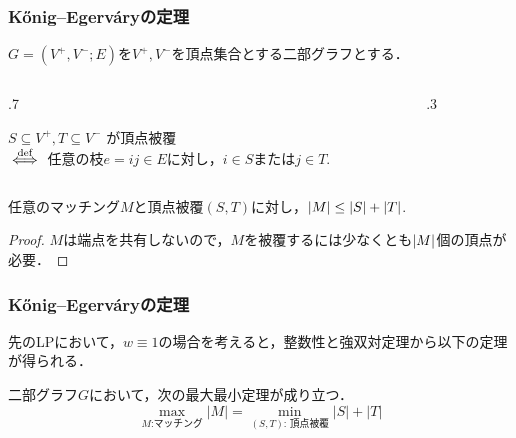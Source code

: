 \documentclass[14pt,aspectratio=169,xcolor=dvipsnames,table,onlytextwidth,dvipdfmx]{beamer}
\begin{document}
\begin{frame}
    \frametitle{K\H{o}nig--Egerv\'aryの定理}

    $G = (V^+, V^-; E)$を$V^+, V^-$を頂点集合とする二部グラフとする．

    \begin{columns}
    \begin{column}{.7\textwidth}
    \begin{definition}
        $S \subseteq V^+, T \subseteq V^-$ が\alert{頂点被覆} \\
        $\overset{\text{def}}{\iff}$ 任意の枝$e = ij \in E$に対し，$i \in S$または$j \in T$.
    \end{definition}
    \end{column}
    \begin{column}{.3\textwidth}
        \centering
        \footnotesize
    \end{column}
    \end{columns}
    \begin{lemma}[弱双対性]
        任意のマッチング$M$と頂点被覆$(S,T)$に対し，$\lvert M\rvert \leq \lvert S\rvert + \lvert T\rvert$.
    \end{lemma}
    \begin{proof}
        $M$は端点を共有しないので，$M$を被覆するには少なくとも$\lvert M\rvert$個の頂点が必要．
    \end{proof}
\end{frame}

\begin{frame}
    \frametitle{K\H{o}nig--Egerv\'aryの定理}
    先のLPにおいて，$w \equiv 1$の場合を考えると，整数性と強双対定理から以下の定理が得られる．

    \bigskip
    \begin{theorem}
        二部グラフ$G$において，次の最大最小定理が成り立つ．
        \[
            \max_{\text{$M$:マッチング}} |M| = \min_{\text{$(S,T)$: 頂点被覆}} |S| + |T|
        \]
    \end{theorem}
\end{frame}
\end{document}
